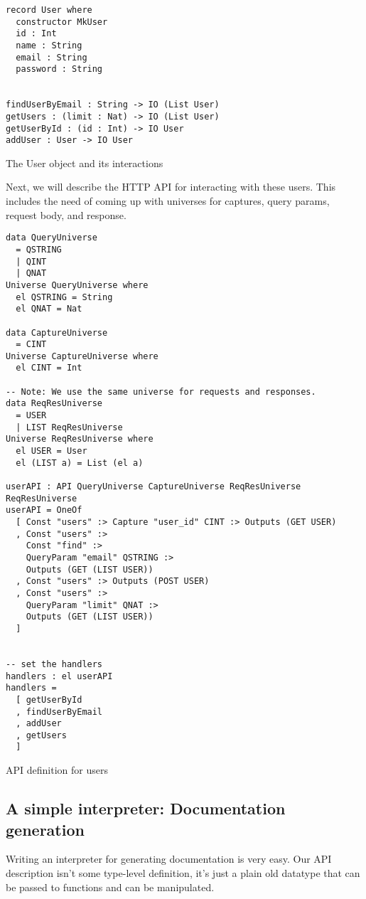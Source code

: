 \documentclass[12pt,a4paper]{article}
\begin{document}
\begin{listing}
\begin{verbatim}
record User where
  constructor MkUser
  id : Int
  name : String
  email : String
  password : String


findUserByEmail : String -> IO (List User)
getUsers : (limit : Nat) -> IO (List User)
getUserById : (id : Int) -> IO User
addUser : User -> IO User
\end{verbatim}
\label{code:domain}
\caption{The User object and its interactions}
\end{listing}

Next, we will describe the HTTP API for interacting with these users.  This includes
the need of coming up with universes for captures, query params, request body, and response.

\begin{listing}
\begin{verbatim}
data QueryUniverse
  = QSTRING
  | QINT
  | QNAT
Universe QueryUniverse where
  el QSTRING = String
  el QNAT = Nat

data CaptureUniverse
  = CINT
Universe CaptureUniverse where
  el CINT = Int

-- Note: We use the same universe for requests and responses.
data ReqResUniverse
  = USER
  | LIST ReqResUniverse
Universe ReqResUniverse where
  el USER = User
  el (LIST a) = List (el a)

userAPI : API QueryUniverse CaptureUniverse ReqResUniverse ReqResUniverse
userAPI = OneOf
  [ Const "users" :> Capture "user_id" CINT :> Outputs (GET USER)
  , Const "users" :>
    Const "find" :>
    QueryParam "email" QSTRING :>
    Outputs (GET (LIST USER))
  , Const "users" :> Outputs (POST USER)
  , Const "users" :>
    QueryParam "limit" QNAT :>
    Outputs (GET (LIST USER))
  ]


-- set the handlers
handlers : el userAPI
handlers =
  [ getUserById
  , findUserByEmail
  , addUser
  , getUsers
  ]

\end{verbatim}
\label{code:api}
\caption{API definition for users}
\end{listing}

\subsection{A simple interpreter: Documentation generation}
Writing an interpreter for generating documentation is very easy. Our API description isn't some type-level definition, it's just a plain old datatype that can be passed to functions and can be manipulated.
\end{document}
